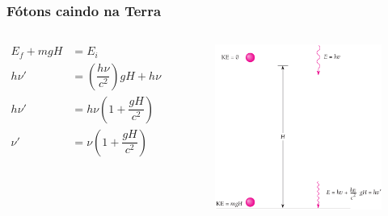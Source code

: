 \documentclass[12pt,brazil]{beamer}
\begin{document}
\begin{frame}
  \frametitle{Fótons caindo na Terra}
    \begin{columns}[c]


      \column{5cm}        
      \fontsize{10pt}{11pt}\selectfont
        \vspace*{-1.25cm}
      
      \begin{align*}
         E_f + mgH &= E_i\\
         h\nu' &= \left(\dfrac{h\nu}{c^2}\right)gH + h\nu\\
         h\nu' &= h\nu \left(1 + \dfrac{gH}{c^2}\right)\\
         \nu' &= \nu \left(1 + \dfrac{gH}{c^2}\right)
      \end{align*}

      
      \column{5cm}
        \vspace*{-1.cm}
        \begin{figure}          
      \hspace*{-0.5cm}\includegraphics[width=6cm]{figuras/fig28}
        \end{figure}
    \end{columns}  

\end{frame}

\end{document}
